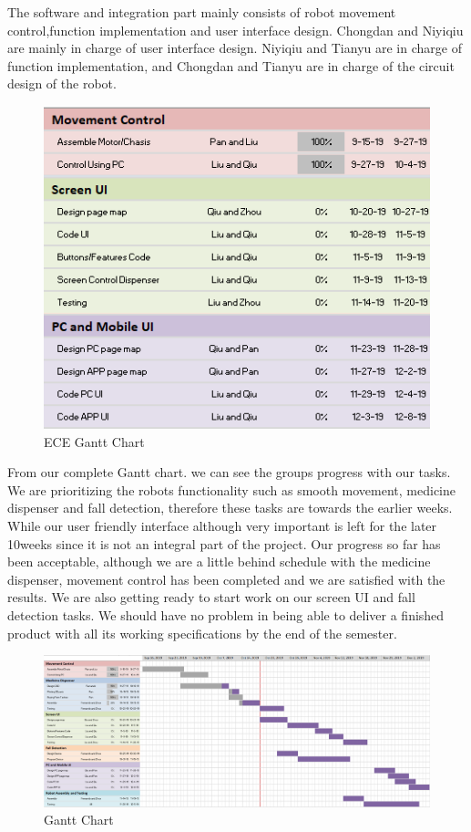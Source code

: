 \documentclass[12pt]{article}
\begin{document}
{The software and integration part mainly consists of robot movement control,function implementation and user interface design. Chongdan and Niyiqiu
are mainly in charge of user interface design. Niyiqiu and Tianyu are in charge of function implementation, and Chongdan and Tianyu are in charge of the circuit design of the robot.
\begin{figure}[H]
	\centering
	\includegraphics[width=0.75\linewidth]{ganttB}
	\caption{ECE Gantt Chart}
\end{figure}
From our complete Gantt chart. we can see the groups progress with
our tasks. We are prioritizing the robots functionality such as smooth movement,
medicine dispenser and fall detection, therefore these tasks are towards the earlier
weeks. While our user friendly interface although very important is left for the later
10weeks since it is not an integral part of the project. Our progress so far has been
acceptable, although we are a little behind schedule with the medicine dispenser,
movement control has been completed and we are satisfied with the results. We are
also getting ready to start work on our screen UI and fall detection tasks. We should
have no problem in being able to deliver a finished product with all its working
specifications by the end of the semester.
\begin{figure}[H]
	\centering
	\includegraphics[width=0.8\linewidth]{ganttC}
	\caption{Gantt Chart}
\end{figure}
}
\end{document}
